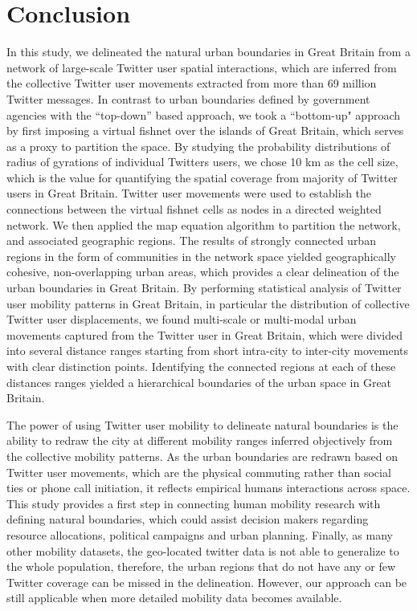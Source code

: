 \documentclass[10pt,letterpaper]{article}
\begin{document}
\section*{Conclusion}
In this study,  we delineated the natural urban boundaries in Great Britain from a network of large-scale Twitter user spatial interactions, which are inferred from the collective Twitter user movements extracted from more than 69 million Twitter messages.
In contrast to urban boundaries defined by government agencies with the ``top-down” based approach, we took a ``bottom-up" approach by first imposing a virtual fishnet over the islands of Great Britain, which serves as a proxy to partition the space.
By studying the probability distributions of radius of gyrations of individual Twitters users, we chose 10 km as the cell size, which is the value for quantifying the spatial coverage from majority of Twitter users in Great Britain. 
Twitter user movements were used to establish the connections between the virtual fishnet cells as nodes in a directed weighted network.  
We then applied the map equation algorithm to partition the network,  and associated geographic regions.
The results of strongly connected urban regions in the form of communities in the network space yielded geographically cohesive, non-overlapping urban areas, which provides a clear delineation of the urban boundaries in Great Britain.
By performing statistical analysis of Twitter user mobility patterns in Great Britain, in particular the distribution of collective Twitter user displacements,  we found multi-scale or multi-modal urban movements captured from the Twitter user in Great Britain, which were divided into several distance ranges starting from short intra-city to inter-city movements with clear distinction points.
Identifying the connected regions at each of these distances ranges yielded a hierarchical boundaries of  the urban space in Great Britain.

The power of using Twitter user mobility to delineate natural boundaries is the ability to redraw the city at different mobility ranges inferred objectively from the collective mobility patterns. 
As the urban boundaries are redrawn based on Twitter user movements, which are the physical commuting rather than social ties or phone call initiation, it reflects empirical humans interactions across space.
This study provides a first step in connecting human mobility research with defining natural boundaries, which could assist decision makers regarding resource allocations, political campaigns and urban planning. Finally, as many other mobility datasets, the geo-located twitter data is not able to generalize to the whole population, therefore, the urban regions that do not have any or few Twitter coverage can be missed in the delineation. However, our approach can be still applicable when more detailed mobility data becomes available. 
 
\end{document}
